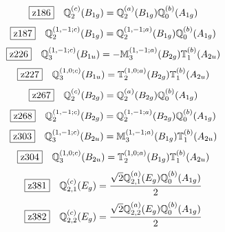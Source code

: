 \documentclass[fleqn,10pt,landscape]{jsarticle}
\begin{document}
\begin{dmath*}
\hspace*{3mm}\fbox{z186}\quad \mathbb{Q}_{2}^{(c)}(B_{1g})=\mathbb{Q}_{2}^{(a)}(B_{1g}) \mathbb{Q}_{0}^{(b)}(A_{1g})
\end{dmath*}
\begin{dmath*}
\hspace*{3mm}\fbox{z187}\quad \mathbb{Q}_{2}^{(1,-1;c)}(B_{1g})=\mathbb{Q}_{2}^{(1,-1;a)}(B_{1g}) \mathbb{Q}_{0}^{(b)}(A_{1g})
\end{dmath*}
\begin{dmath*}
\hspace*{3mm}\fbox{z226}\quad \mathbb{Q}_{3}^{(1,-1;c)}(B_{1u})=- \mathbb{M}_{3}^{(1,-1;a)}(B_{2g}) \mathbb{T}_{1}^{(b)}(A_{2u})
\end{dmath*}
\begin{dmath*}
\hspace*{3mm}\fbox{z227}\quad \mathbb{Q}_{3}^{(1,0;c)}(B_{1u})=\mathbb{T}_{2}^{(1,0;a)}(B_{2g}) \mathbb{T}_{1}^{(b)}(A_{2u})
\end{dmath*}
\begin{dmath*}
\hspace*{3mm}\fbox{z267}\quad \mathbb{Q}_{2}^{(c)}(B_{2g})=\mathbb{Q}_{2}^{(a)}(B_{2g}) \mathbb{Q}_{0}^{(b)}(A_{1g})
\end{dmath*}
\begin{dmath*}
\hspace*{3mm}\fbox{z268}\quad \mathbb{Q}_{2}^{(1,-1;c)}(B_{2g})=\mathbb{Q}_{2}^{(1,-1;a)}(B_{2g}) \mathbb{Q}_{0}^{(b)}(A_{1g})
\end{dmath*}
\begin{dmath*}
\hspace*{3mm}\fbox{z303}\quad \mathbb{Q}_{3}^{(1,-1;c)}(B_{2u})=\mathbb{M}_{3}^{(1,-1;a)}(B_{1g}) \mathbb{T}_{1}^{(b)}(A_{2u})
\end{dmath*}
\begin{dmath*}
\hspace*{3mm}\fbox{z304}\quad \mathbb{Q}_{3}^{(1,0;c)}(B_{2u})=\mathbb{T}_{2}^{(1,0;a)}(B_{1g}) \mathbb{T}_{1}^{(b)}(A_{2u})
\end{dmath*}
\begin{dmath*}
\hspace*{3mm}\fbox{z381}\quad \mathbb{Q}_{2,1}^{(c)}(E_{g})=\frac{\sqrt{2} \mathbb{Q}_{2,1}^{(a)}(E_{g}) \mathbb{Q}_{0}^{(b)}(A_{1g})}{2}
\end{dmath*}
\begin{dmath*}
\hspace*{3mm}\fbox{z382}\quad \mathbb{Q}_{2,2}^{(c)}(E_{g})=\frac{\sqrt{2} \mathbb{Q}_{2,2}^{(a)}(E_{g}) \mathbb{Q}_{0}^{(b)}(A_{1g})}{2}
\end{dmath*}
\end{document}
